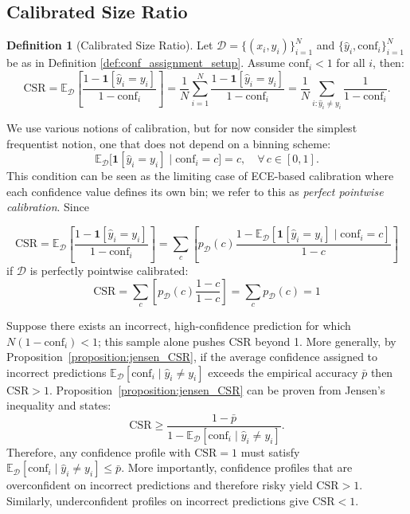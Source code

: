 \documentclass{article}
\theoremstyle{plain}
\theoremstyle{definition}
\newtheorem{definition}{Definition}
\theoremstyle{remark}
\begin{document}
\subsection{Calibrated Size Ratio}

\begin{definition}[Calibrated Size Ratio]\label{def:cal_dif}
Let $\mathcal{D} = \{(x_i, y_i)\}_{i=1}^N$ and $\{\hat{y}_i, \text{conf}_i\}_{i=1}^N$ be as in Definition \ref{def:conf_assignment_setup}. Assume  $\text{conf}_i < 1$ for all $i$, then: \[
\text{CSR} = \mathbb{E}_{\mathcal{D}}\left[\frac{1 - \mathbf{1}[\hat{y}_i = y_i]}{1 - \text{conf}_i}\right] = \frac{1}{N}\sum_{i=1}^N \frac{1 - \mathbf{1}[\hat{y}_i = y_i]}{1 - \text{conf}_i} = \frac{1}{N}\sum_{i:\hat{y}_i \neq y_i} \frac{1}{1 - \text{conf}_i}.
\]
\end{definition}
\smallskip

We use various notions of calibration, but for now consider the simplest frequentist notion, one that does not depend on a binning scheme:
\[
    \mathbb{E}_{\mathcal{D}}\big[\mathbf{1}[\hat{y}_i = y_i] \mid \mathrm{conf}_i = c\big] = c, 
    \quad \forall\, c \in [0,1].
\]
This condition can be seen as the limiting case of ECE-based calibration where each confidence value defines its own bin; 
we refer to this as \emph{perfect pointwise calibration}. Since

\begin{equation}
\text{CSR} = \mathbb{E}_{\mathcal{D}}\left[\frac{1 - \mathbf{1}[\hat{y}_i = y_i]}{1 - \text{conf}_i}\right] = \sum_c \left[p_{\mathcal{D}}(c) \frac{1 -  \mathbb{E}_{\mathcal{D}}[  \mathbf{1}[\hat{y}_i = y_i]  \mid \mathrm{conf}_i = c ]}{1 - c}\right] 
 \label{eq:CSR_conditional}
\end{equation}
if  $\mathcal{D}$ is perfectly pointwise calibrated: 
\[
\text{CSR} = \sum_c \left[p_{\mathcal{D}}(c) \frac{1 - c}{1 - c}\right] = \sum_c p_{\mathcal{D}}(c) = 1
\]

Suppose there exists an incorrect, high-confidence prediction for which $N(1 - \mathrm{conf}_i) < 1$; this sample alone pushes $\mathrm{CSR}$ beyond 1. More generally, by Proposition~\ref{proposition:jensen_CSR}, if the average confidence assigned to incorrect predictions $\mathbb{E}_{\mathcal{D}}[\mathrm{conf}_i \mid \hat{y}_i \neq y_i]$ exceeds the empirical accuracy $\bar{p}$ then $\mathrm{CSR} > 1$.  Proposition~\ref{proposition:jensen_CSR} can be proven from Jensen's inequality and states: \[
    \mathrm{CSR} \geq \frac{1 - \bar{p}}{1 - \mathbb{E}_{\mathcal{D}}[\mathrm{conf}_i \mid \hat{y}_i \neq y_i]}.
\]
Therefore, any confidence profile with $\mathrm{CSR} = 1$ must satisfy $\mathbb{E}_{\mathcal{D}}[\mathrm{conf}_i \mid \hat{y}_i \neq y_i] \leq \bar{p}$. More importantly, confidence profiles that are overconfident on incorrect predictions and therefore risky yield $\mathrm{CSR} > 1$. Similarly, underconfident profiles on incorrect predictions give $\mathrm{CSR} < 1$.
\end{document}
